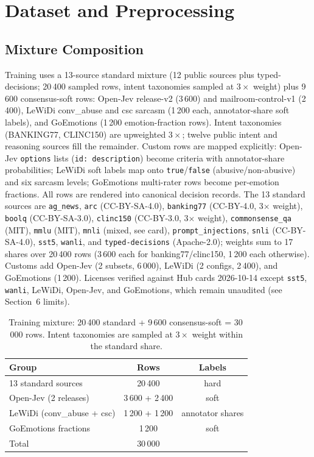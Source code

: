 \section{Dataset and Preprocessing}
\subsection{Mixture Composition}
Training uses a 13-source standard mixture (12 public sources plus
typed-decisions; 20\,400 sampled rows, intent taxonomies sampled at
$3\times$ weight) plus 9\,600 consensus-soft rows: Open-Jev release-v2 (3\,600) and mailroom-control-v1
(2\,400), LeWiDi conv\_abuse and csc sarcasm (1\,200 each, annotator-share soft
labels), and GoEmotions (1\,200 emotion-fraction rows). Intent taxonomies
(BANKING77, CLINC150) are upweighted $3\times$; twelve public intent and
reasoning sources fill the remainder. Custom rows are mapped explicitly:
Open-Jev \texttt{options} lists (\texttt{id: description}) become criteria with
annotator-share probabilities; LeWiDi soft labels map onto
\texttt{true}/\texttt{false} (abusive/non-abusive) and six sarcasm levels;
GoEmotions multi-rater rows become per-emotion fractions. All rows are rendered
into canonical decision records. The 13 standard sources are
\texttt{ag\_news}, \texttt{arc} (CC-BY-SA-4.0), \texttt{banking77} (CC-BY-4.0,
3$\times$ weight), \texttt{boolq} (CC-BY-SA-3.0), \texttt{clinc150} (CC-BY-3.0,
3$\times$ weight), \texttt{commonsense\_qa} (MIT), \texttt{mmlu} (MIT),
\texttt{mnli} (mixed, see card), \texttt{prompt\_injections},
\texttt{snli} (CC-BY-SA-4.0), \texttt{sst5}, \texttt{wanli}, and
\texttt{typed-decisions} (Apache-2.0); weights sum to 17 shares over 20\,400
rows (3\,600 each for banking77/clinc150, 1\,200 each otherwise). Customs add
Open-Jev (2 subsets, 6\,000), LeWiDi (2 configs, 2\,400), and GoEmotions
(1\,200). Licenses verified against Hub cards 2026-10-14 except
\texttt{sst5}, \texttt{wanli}, LeWiDi, Open-Jev, and GoEmotions, which remain
unaudited (see Section~6 limits).

\begin{table}[htbp]
\caption{Training mixture: 20\,400 standard + 9\,600 consensus-soft = 30\,000 rows.
Intent taxonomies are sampled at $3\times$ weight within the standard share.}
\label{tab:mixture}
\begin{center}
\setlength{\tabcolsep}{4pt}
\begin{small}
\begin{tabular}{lcc}
\toprule
Group & Rows & Labels \\
\midrule
13 standard sources & 20\,400 & hard \\
Open-Jev (2 releases) & 3\,600 + 2\,400 & soft \\
LeWiDi (conv\_abuse + csc) & 1\,200 + 1\,200 & annotator shares \\
GoEmotions fractions & 1\,200 & soft \\
\midrule
Total & 30\,000 & \\
\bottomrule
\end{tabular}
\end{small}
\end{center}
\end{table}

